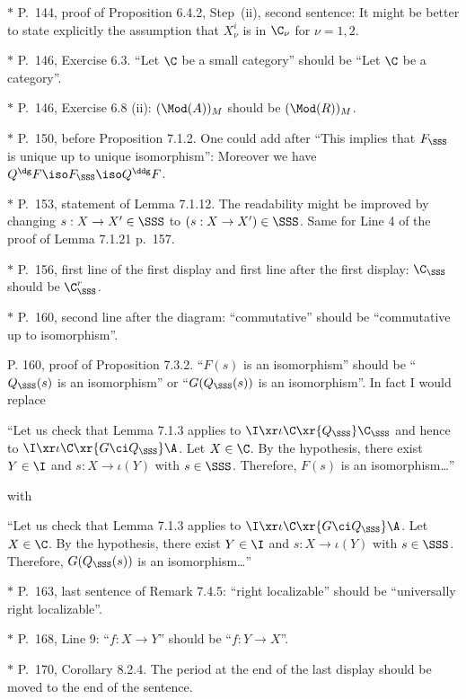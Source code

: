 \documentclass[12pt]{article}
\theoremstyle{remark}
\theoremstyle{definition}
\begin{document}
\nn$*$ P.~144, proof of Proposition 6.4.2, Step~(ii), second sentence: It might be better to state explicitly the assumption that $X_\nu^i$ is in $\C_\nu$ for $\nu=1,2$. 

\nn$*$ P.~146, Exercise 6.3. ``Let $\C$ be a small category'' should be ``Let $\C$ be a category''.

\nn$*$ P.~146, Exercise 6.8 (ii): $(\Mod(A))_M$  should be $(\Mod(R))_M$.

\nn$*$ P.~150, before Proposition 7.1.2. One could add after ``This implies that $F_{\SSS}$ is unique up to unique isomorphism'': Moreover we have $Q^\dg F\iso F_{\SSS}\iso Q^\ddg F$.

\nn$*$ P.~153, statement of Lemma 7.1.12. The readability might be improved by changing $s:X\to X'\in\SSS$ to $(s:X\to X')\in\SSS$. Same for Line 4 of the proof of Lemma 7.1.21 p.~157.

\nn$*$ P.~156, first line of the first display and first line after the first display: $\C_\SSS$ should be $\C_\SSS^r$.

\nn$*$ P.~160, second line after the diagram: ``commutative'' should be ``commutative up to isomorphism''. %

%

\begin{s}
P. 160, proof of Proposition 7.3.2. ``$F(s)$ is an isomorphism'' should be ``$Q_\SSS(s)$ is an isomorphism'' or ``$G(Q_\SSS(s))$ is an isomorphism''. In fact I would replace 

\nn``Let us check that Lemma 7.1.3 applies to $\I\xr\iota\C\xr{Q_\SSS}\C_\SSS$ and hence to $\I\xr\iota\C\xr{G\ci Q_\SSS}\A$. Let $X\in\C$. By the hypothesis, there exist $Y\in\I$ and $s:X\to\iota(Y)$ with $s\in\SSS$. Therefore, $F(s)$ is an isomorphism\dots''

\nn with

\nn``Let us check that Lemma 7.1.3 applies to $\I\xr\iota\C\xr{G\ci Q_\SSS}\A$. Let $X\in\C$. By the hypothesis, there exist $Y\in\I$ and $s:X\to\iota(Y)$ with $s\in\SSS$. Therefore, $G(Q_\SSS(s))$ is an isomorphism\dots''
\end{s}

%

\nn$*$ P.~163, last sentence of Remark 7.4.5: ``right localizable'' should be ``universally right localizable''.

\nn$*$ P.~168, Line 9: ``$f:X\to Y$'' should be ``$f:Y\to X$''.

\nn$*$ P.~170, Corollary 8.2.4. The period at the end of the last display should be moved to the end of the sentence.
\end{document}
